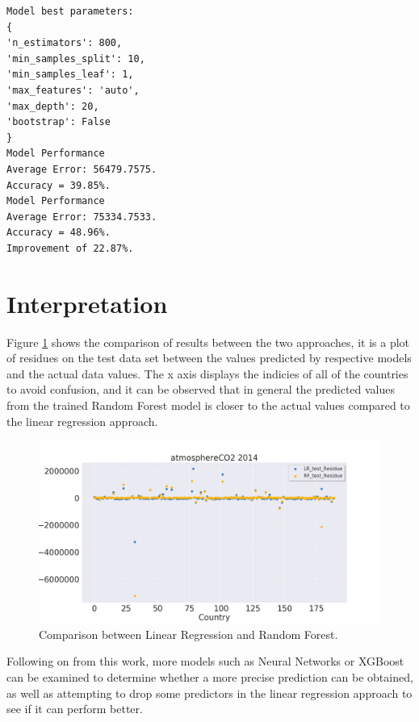 \documentclass[11pt,a4paper,titlepage]{article}
\begin{document}
\begin{verbatim}
Model best parameters:
{
'n_estimators': 800, 
'min_samples_split': 10, 
'min_samples_leaf': 1, 
'max_features': 'auto', 
'max_depth': 20, 
'bootstrap': False
}
Model Performance
Average Error: 56479.7575.
Accuracy = 39.85%.
Model Performance
Average Error: 75334.7533.
Accuracy = 48.96%.
Improvement of 22.87%.
\end{verbatim}

\section{Interpretation}

Figure \ref{fig:atmosphereCO2_test_residue} shows the comparison of results between the two approaches, it is a plot of residues on the test data set between the values predicted by respective models and the actual data values. The x axis displays the indicies of all of the countries to avoid confusion, and it can be observed that in general the predicted values from the trained Random Forest model is closer to the actual values compared to the linear regression approach.

\begin{figure}[!htbp]
    \begin{center}
        \includegraphics[width=\textwidth]{../Plots/atmosphereCO2_test_residue.png}
        \caption{Comparison between Linear Regression and Random Forest.}
        \label{fig:atmosphereCO2_test_residue}
    \end{center}
\end{figure}

Following on from this work, more models such as Neural Networks or XGBoost can be examined to determine whether a more precise prediction can be obtained, as well as attempting to drop some predictors in the linear regression approach to see if it can perform better.
\end{document}

